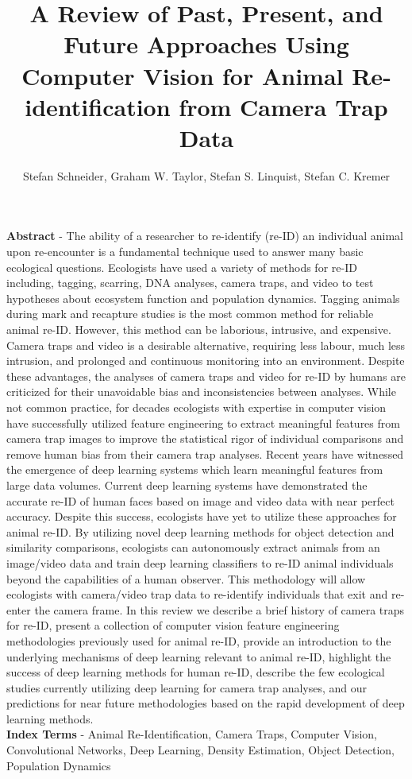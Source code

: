\documentclass[11pt]{article}
\begin{document}
\title{A Review of Past, Present, and Future Approaches Using Computer Vision for Animal Re-identification from Camera Trap Data}

\author{Stefan Schneider, Graham W. Taylor, Stefan S. Linquist, Stefan C. Kremer}


\maketitle

\textbf{Abstract} - The ability of a researcher to re-identify (re-ID) an individual animal upon re-encounter is a fundamental technique used to answer many basic ecological questions. Ecologists have used a variety of methods for re-ID including, tagging, scarring, DNA analyses, camera traps, and video to test hypotheses about ecosystem function and population dynamics. Tagging animals during mark and recapture studies is the most common method for reliable animal re-ID. However, this method can be laborious, intrusive, and expensive. Camera traps and video is a desirable alternative, requiring less labour, much less intrusion, and prolonged and continuous monitoring into an environment. Despite these advantages, the analyses of camera traps and video for re-ID by humans are criticized for their unavoidable bias and inconsistencies between analyses. While not common practice, for decades ecologists with expertise in computer vision have successfully utilized feature engineering to extract meaningful features from camera trap images to improve the statistical rigor of individual comparisons and remove human bias from their camera trap analyses. Recent years have witnessed the emergence of deep learning systems which learn meaningful features from large data volumes. Current deep learning systems have demonstrated the accurate re-ID of human faces based on image and video data with near perfect accuracy. Despite this success, ecologists have yet to utilize these approaches for animal re-ID. By utilizing novel deep learning methods for object detection and similarity comparisons, ecologists can autonomously extract animals from an image/video data and train deep learning classifiers to re-ID animal individuals beyond the capabilities of a human observer. This methodology will allow ecologists with camera/video trap data to re-identify individuals that exit and re-enter the camera frame. In this review we describe a brief history of camera traps for re-ID, present a collection of computer vision feature engineering methodologies previously used for animal re-ID, provide an introduction to the underlying mechanisms of deep learning relevant to animal re-ID, highlight the success of deep learning methods for human re-ID, describe the few ecological studies currently utilizing deep learning for camera trap analyses, and our predictions for near future methodologies based on the rapid development of deep learning methods.
\newline
\\
\textbf{Index Terms} - Animal Re-Identification, Camera Traps, Computer Vision, Convolutional Networks, Deep Learning, Density Estimation, Object Detection, Population Dynamics
\end{document}
